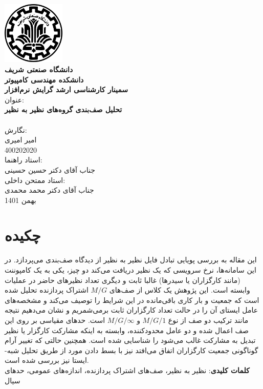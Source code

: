 \documentclass[11pt, oneside]{article}
\begin{document}
	\begin{titlepage}
		\linespread{1.5}
		\centering
		\includegraphics[width=3cm]{sharif-logo.png}\\[\bigskipamount]
		\normalsize	\textbf{دانشگاه صنعتی شریف}\\
		\textbf{دانشکده مهندسی کامپیوتر}\\
		\textbf{سمینار کارشناسی ارشد گرایش نرم‌افزار}%
		\\[1.3cm]
		
		\LARGE		عنوان:\\
		\textbf{تحلیل صف‌بندی گروه‌های نظیر به نظیر}\\
		\textbf{}\\[2cm]
		
		\large	 نگارش:\\
		امیر امیری\\
		400202020\\[1.3cm]
		استاد راهنما:\\
		جناب آقای دکتر حسین حسینی\\[1.3cm]
	
		استاد ممتحن داخلی:\\
		جناب آقای دکتر محمد محمدی\\[1.3cm]
		\vfill
		بهمن 1401
		
	\end{titlepage}
	\clearpage
	\setcounter{figure}{0}
	\section*{چکیده}
این مقاله به بررسی پویایی‌ تبادل فایل نظیر به نظیر از دیدگاه صف‌بندی می‌پردازد. در این سامانه‌ها، نرخ سرویسی که یک نظیر دریافت می‌کند  دو چیز، یکی به یک کامپوننت (مانند کارگزاران یا سیدر‌ها) غالبا ثابت و دیگری تعداد نظیرهای حاضر در عملیات وابسته است. این پژوهش یک کلاس از صف‌های $M/G$ اشتراک پردازنده تحلیل شده است که جمعیت و بار کاری باقی‌مانده در این شرایط را توصیف می‌کند و مشخصه‌های عامل ایستای ‌آن را در حالت تعداد کارگزاران ثابت برمی‌شمریم و نشان می‌دهیم نتیجه مانند ترکیب دو صف از نوع $M/G/1$ و $M/G/\infty$ است. حدهای مقیاسی بر روی این صف اعمال شده و دو عامل محدودکننده، وابسته به اینکه مشارکت کارگزار یا نظیر تبدیل به مشارکت غالب می‌شود را شناسایی شده است. همچنین حالتی که تغییر آرام گوناگونی جمعیت کارگزاران اتفاق می‌افتد نیز با بسط دادن مورد از طریق تحلیل‌ شبه-ایستا نیز بررسی شده است.
\\[1ex]%
\textbf{کلمات کلیدی}: نظیر به نظیر، صف‌های اشتراک پردازنده، اندا‌زه‌های عمومی، حد‌های سیال
\end{document}
